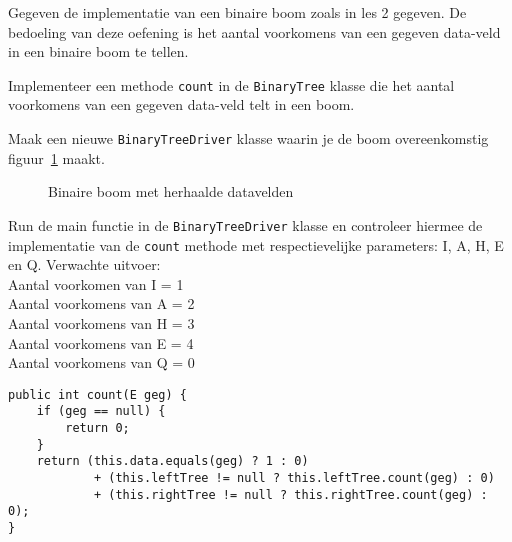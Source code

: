 \begin{oef}
\code Gegeven de implementatie van een binaire boom zoals in les 2 gegeven.
De bedoeling van deze oefening is het aantal voorkomens van een gegeven data-veld in een binaire boom te tellen.
\begin{oefenumerate}
\item Implementeer een methode \verb+count+ in de \verb+BinaryTree+ klasse die het aantal voorkomens van een gegeven data-veld telt in een boom.
\item Maak een nieuwe \verb+BinaryTreeDriver+ klasse waarin je de boom overeenkomstig figuur~\ref{fig:herhalingsoefbb} maakt.
\begin{figure}[htbp]
    \centering
{}

\caption{Binaire boom met herhaalde datavelden}
    \label{fig:herhalingsoefbb}
\end{figure}
\item Run de main functie in de \verb+BinaryTreeDriver+ klasse en controleer hiermee de implementatie van de \verb+count+ methode met respectievelijke parameters: I, A, H, E en Q.
Verwachte uitvoer:\\
Aantal voorkomen van I = 1\\
Aantal voorkomens van A = 2\\
Aantal voorkomens van H = 3\\
Aantal voorkomens van E = 4\\
Aantal voorkomens van Q = 0\\
\end{oefenumerate}
\begin{opl}
\begin{lstlisting}[caption={count methode}, label=herhoefbbcount]
public int count(E geg) {
	if (geg == null) {
		return 0;
	}
	return (this.data.equals(geg) ? 1 : 0) 
			+ (this.leftTree != null ? this.leftTree.count(geg) : 0) 
			+ (this.rightTree != null ? this.rightTree.count(geg) : 0);
}
\end{lstlisting}
\end{opl}
\end{oef}


